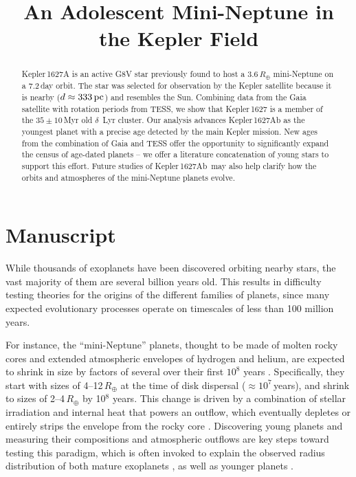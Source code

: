 \documentclass[12pt,modern,tighten]{aastex63}
\newcommand{\pn}{Kepler\,1627Ab} %
\begin{document}

\title{
  An Adolescent Mini-Neptune in the Kepler Field
}



\begin{abstract}
  Kepler\,1627A is an active G8V star previously found to host a
  $3.6\,R_\oplus$ mini-Neptune on a 7.2\,day orbit.  The star was
  selected for observation by the Kepler satellite because it is
  nearby ($d\approx 333\,{\rm pc}$) and resembles the Sun.  Combining
  data from the Gaia satellite with rotation periods from TESS, we
  show that Kepler\,1627 is a member of the $35\pm 10$\,Myr old
  $\delta$~Lyr cluster.  Our analysis advances Kepler\,1627Ab as the
  youngest planet with a precise age detected by the main Kepler
  mission.  New ages from the combination of Gaia and TESS offer the
  opportunity to significantly expand the census of age-dated planets
  -- we offer a literature concatenation of young stars to support
  this effort.  Future studies of \pn\ may also help clarify how the
  orbits and atmospheres of the mini-Neptune planets evolve.
\end{abstract}




\section{Manuscript}

While thousands of exoplanets have been discovered orbiting nearby
stars, the vast majority of them are several billion years old.  This
results in difficulty testing theories for the origins of the
different families of planets, since many expected evolutionary
processes operate on timescales of less than 100 million years.  

For instance, the ``mini-Neptune'' planets, thought to be made of
molten rocky cores and extended atmospheric envelopes of hydrogen and
helium, are expected to shrink in size by factors of several over
their first $10^8$ years \citep{owen_constraining_2020}.
Specifically, they start with sizes of 4--12\,$R_\oplus$ at the time
of disk dispersal ($\approx$$10^7$\,years), and shrink to sizes of
2--4\,$R_\oplus$ by 10$^8$ years.  This change is driven by a
combination of stellar irradiation and internal heat that powers an
outflow, which eventually depletes or entirely strips the envelope
from the rocky core \citep{Owen_Wu_2013,gupta_sculpting_2019}.
Discovering young planets and measuring their compositions and
atmospheric outflows are key steps toward testing this paradigm, which
is often invoked to explain the observed radius distribution of both
mature exoplanets \citep{Fulton_et_al_2017}, as well as younger
planets \citep{bouma_cluster_2020}.
\end{document}
